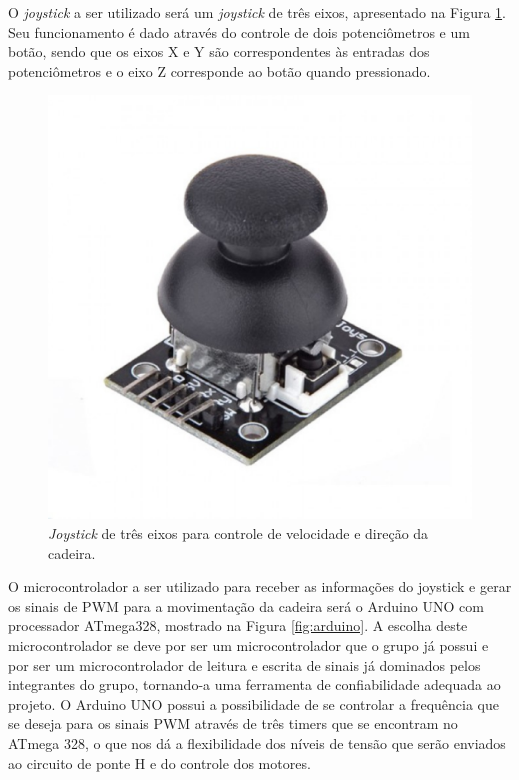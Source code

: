 O \textit{joystick} a ser utilizado será um \textit{joystick} 
de três eixos, apresentado na Figura \ref{fig:joystick}. Seu funcionamento é dado através do controle de 
dois potenciômetros e um botão, sendo que os eixos X e Y são 
correspondentes às entradas dos potenciômetros e o eixo Z corresponde ao botão quando pressionado.

\begin{figure}[H]
  \centering
    \includegraphics[width=\textwidth]{figuras/joystick.eps}
  \caption{\textit{Joystick} de três eixos para controle de velocidade e direção da cadeira.}
  \label{fig:joystick}
\end{figure}

O microcontrolador a ser utilizado para receber as informações 
do joystick e gerar os sinais de PWM para a movimentação 
da cadeira será o Arduino UNO com processador ATmega328, mostrado na Figura \ref{fig:arduino}. A escolha deste 
microcontrolador se deve por ser um microcontrolador que o grupo 
já possui e por ser um microcontrolador de leitura e escrita de 
sinais já dominados pelos integrantes do grupo, tornando-a 
uma ferramenta de confiabilidade adequada ao projeto. O Arduino UNO
possui a possibilidade de se controlar a frequência que se deseja 
para os sinais 
PWM através de três timers que se encontram no ATmega 328, o que nos 
dá a flexibilidade dos níveis de tensão que serão enviados ao 
circuito de ponte H e do controle dos motores.

